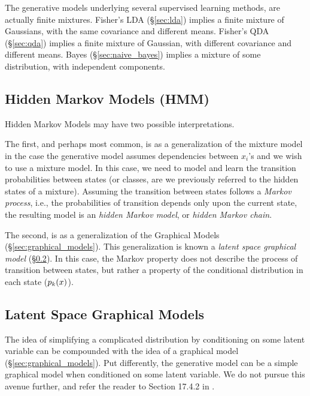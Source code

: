 \begin{remark}
The generative models underlying several supervised learning methods, are actually finite mixtures.
Fisher's LDA (\S\ref{sec:lda}) implies a finite mixture of Gaussians, with the same covariance and different means.
Fisher's QDA (\S\ref{sec:qda}) implies a finite mixture of Gaussian, with different covariance and different means.
\Naive Bayes (\S\ref{sec:naive_bayes}) implies a mixture of some distribution, with independent components.
\end{remark}





\subsection{Hidden Markov Models (HMM)}
\label{sec:hmm}
Hidden Markov Models may have two possible interpretations.

The first, and perhaps most common, is as a generalization of the mixture model in the case the generative model assumes dependencies between $x_i$'s and we wish to use a mixture model. 
In this case, we need to model and learn the transition probabilities between states (or classes, are we previously referred to the hidden states of a mixture). 
Assuming the transition between states follows a \emph{Markov process}, i.e., the probabilities of transition depends only upon the current state, the resulting model is an \emph{hidden Markov model}, or \emph{hidden Markov chain}.

The second, is as a generalization of the Graphical Models (\S\ref{sec:graphical_models}). 
This generalization is known a \emph{latent space graphical model} (\S\ref{sec:latent_graphical}). 
In this case, the Markov property does not describe the process of transition between states, but rather a property of the conditional distribution in each state ($p_k(x)$). 




\subsection{Latent Space Graphical Models}
\label{sec:latent_graphical}

The idea of simplifying a complicated distribution by conditioning on some latent variable can be compounded with the idea of a graphical model (\S\ref{sec:graphical_models}). 
Put differently, the generative model can be a simple graphical model when conditioned on some latent variable.
We do not pursue this avenue further, and refer the reader to Section 17.4.2 in \cite{hastie_elements_2003}.





